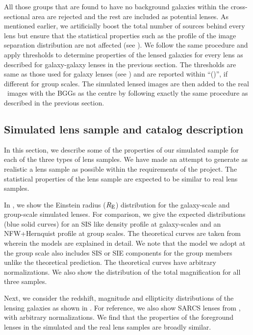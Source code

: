 \documentclass[useAMS,usenatbib,a4paper]{mn2e}
\begin{document}
All those groups that are found to have no background galaxies within the
cross-sectional area are rejected and the rest are included as potential lenses.
As mentioned earlier, we artificially boost the total number of sources behind
every lens but ensure that the statistical properties such as the profile of the
image separation distribution are not affected (see ). We
follow the same procedure and apply thresholds to determine properties
of the lensed galaxies for every lens as described for galaxy-galaxy lenses
in the previous section. The thresholds are same as those used for
galaxy lenses (see ) and are reported within ``()'', if
different for group scales. The simulated lensed images are then added
to the real \cfhtls~images with the BGGs as the centre by following
exactly the same procedure as described in the previous section.


\subsection{Simulated lens sample and catalog description}

In this section, we describe some of the properties of our simulated sample for
each of the three types of lens samples. We have made an attempt to
generate as realistic a lens sample as possible within the requirements
of the \sw project. The statistical properties of the lens sample are
expected to be similar to real lens samples.

In , we show the Einstein radius ($R_{\rm E}$) distribution for the
galaxy-scale and group-scale simulated lenses. For comparison, we give
the expected distributions (blue solid curves) for an SIS like density
profile at galaxy-scales and an NFW+Hernquist profile at group scales.
The theoretical curves are taken from \citet{More2012} wherein the
models are explained in detail. We note that the model we adopt at
the group scale also includes SIS or SIE components for the group members
unlike the theoretical prediction. The theoretical curves have arbitrary
normalizations. We also show the distribution of the total magnification
for all three samples.

Next, we consider the redshift, magnitude and ellipticity distributions
of the lensing galaxies as shown in . For reference,
we also show SARCS lenses from \citet{More2012}, with arbitrary
normalizations. We find that the properties of the foreground lenses in
the simulated and the real lens samples are broadly similar.
\end{document}
